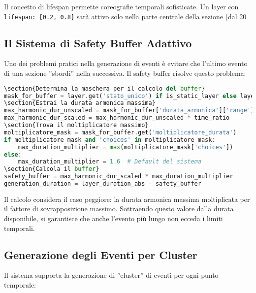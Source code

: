Il concetto di lifespan permette coreografie temporali sofisticate. Un layer con \texttt{lifespan: [0.2, 0.8]} sarà attivo solo nella parte centrale della sezione (dal 20%
\subsection{Il Sistema di Safety Buffer Adattivo}
Uno dei problemi pratici nella generazione di eventi è evitare che l'ultimo evento di una sezione ''sbordi'' nella successiva. Il safety buffer risolve questo problema:

\begin{lstlisting}[language=Python]
\section{Determina la maschera per il calcolo del buffer}
mask_for_buffer = layer.get('stato_unico') if is_static_layer else layer.get('stato_finale')
\section{Estrai la durata armonica massima}
max_harmonic_dur_unscaled = mask_for_buffer['durata_armonica']['range'][1]
max_harmonic_dur_scaled = max_harmonic_dur_unscaled * time_ratio
\section{Trova il moltiplicatore massimo}
moltiplicatore_mask = mask_for_buffer.get('moltiplicatore_durata')
if moltiplicatore_mask and 'choices' in moltiplicatore_mask:
    max_duration_multiplier = max(moltiplicatore_mask['choices'])
else:
    max_duration_multiplier = 1.6  # Default del sistema
\section{Calcola il buffer}
safety_buffer = max_harmonic_dur_scaled * max_duration_multiplier
generation_duration = layer_duration_abs - safety_buffer
\end{lstlisting}

Il calcolo considera il caso peggiore: la durata armonica massima moltiplicata per il fattore di sovrapposizione massimo. Sottraendo questo valore dalla durata disponibile, si garantisce che anche l'evento più lungo non ecceda i limiti temporali.
\subsection{Generazione degli Eventi per Cluster}
Il sistema supporta la generazione di ''cluster'' di eventi per ogni punto temporale:

